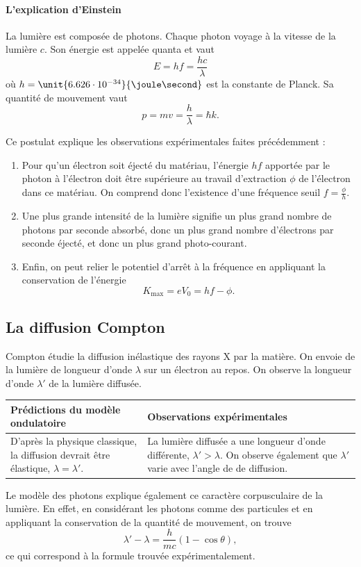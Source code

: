 \paragraph{L'explication d'Einstein}
La lumière est composée de photons.
Chaque photon voyage à la vitesse de la lumière $c$.
Son énergie est appelée quanta et vaut
\[ E = hf = \frac{hc}{\lambda} \]
où $h = \unit{6.626\cdot10^{-34}}{\joule\second}$ est
la constante de Planck.
Sa quantité de mouvement vaut
\[ p = mv = \frac{h}{\lambda} = \hbar k. \]

Ce postulat explique les observations expérimentales
faites précédemment :
\begin{enumerate}
	\item	Pour qu'un électron soit éjecté du matériau,
	l'énergie $hf$ apportée par le photon à
	l'électron doit être supérieure au travail d'extraction
	$\phi$ de l'électron dans ce matériau. On comprend donc
	l'existence d'une fréquence seuil $f = \frac{\phi}{h}$.
	\item Une plus grande intensité de la lumière signifie
	un plus grand nombre de photons par seconde absorbé,
	donc un plus grand nombre d'électrons par seconde éjecté,
	et donc un plus grand photo-courant.
	\item Enfin, on peut relier le potentiel d'arrêt à la
	fréquence en appliquant la conservation de l'énergie
	\[ K_{\text{max}} = eV_0 = hf - \phi .\]
\end{enumerate}

\subsection{La diffusion Compton}
Compton étudie la diffusion inélastique des rayons X
par la matière. On envoie de la lumière de longueur d'onde
$\lambda$ sur un électron au repos. On observe la longueur
d'onde $\lambda'$ de la lumière diffusée.

\begin{tabular}{p{}|p{}}
	\textbf{Prédictions du modèle ondulatoire} & \textbf{Observations expérimentales} \\
	\hline
	D'après la physique classique, la diffusion devrait être élastique, $\lambda = \lambda'$.
	& La lumière diffusée a une longueur d'onde différente, $\lambda' > \lambda$. On observe
	également que $\lambda'$ varie avec l'angle de de diffusion.
\end{tabular}

Le modèle des photons explique également ce caractère corpusculaire
de la lumière. En effet, en considérant les photons comme des
particules et en appliquant la conservation de la quantité
de mouvement, on trouve
\[ \lambda' -\lambda = \frac{h}{mc}(1-\cos\theta),\]
ce qui correspond à la formule trouvée expérimentalement.

